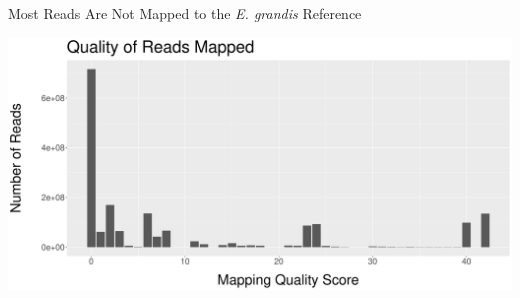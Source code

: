 \documentclass{beamer}
\begin{document}
\begin{frame}{Most Reads Are Not Mapped to the \textit{E. grandis} Reference}
\begin{center}
\includegraphics[width=\linewidth]{bowtie1_hist.pdf}
\end{center}
\end{frame}
\end{document}
